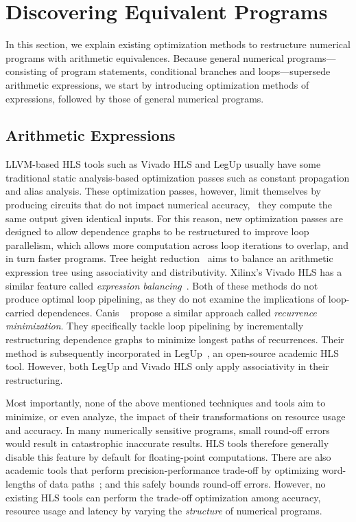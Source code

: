 \section{Discovering Equivalent Programs}
\label{bg:sec:discovering_equivalent_programs}

In this section, we explain existing optimization methods to restructure
numerical programs with arithmetic equivalences.  Because general numerical
programs---consisting of program statements, conditional branches and
loops---supersede arithmetic expressions, we start by introducing optimization
methods of expressions, followed by those of general numerical programs.


\subsection{Arithmetic Expressions}
\label{bg:sub:arithmetic_expressions}

LLVM-based HLS tools such as Vivado HLS and LegUp usually have some
traditional static analysis-based optimization passes such as constant
propagation and alias analysis.  These optimization passes, however, limit
themselves by producing circuits that do not impact numerical accuracy,
\ie~they compute the same output given identical inputs.  For this reason,
new optimization passes are designed to allow dependence graphs to be
restructured to improve loop parallelism, which allows more computation
across loop iterations to overlap, and in turn faster programs.  Tree height
reduction~\cite{nicolau91} aims to balance an arithmetic expression tree using
associativity and distributivity.  Xilinx's Vivado HLS has a similar feature
called \emph{expression balancing}~\cite{vivado_hls}.  Both of these methods do
not produce optimal loop pipelining, as they do not examine the implications
of loop-carried dependences.  Canis \etal~\cite{canis14} propose a similar
approach called \emph{recurrence minimization}. They specifically tackle
loop pipelining by incrementally restructuring dependence graphs to minimize
longest paths of recurrences.  Their method is subsequently incorporated in
LegUp~\cite{legup}, an open-source academic HLS tool.  However, both LegUp and
Vivado HLS only apply associativity in their restructuring.

Most importantly, none of the above mentioned techniques and tools aim to
minimize, or even analyze, the impact of their transformations on resource
usage and accuracy. In many numerically sensitive programs, small round-off
errors would result in catastrophic inaccurate results.  HLS tools therefore
generally disable this feature by default for floating-point computations.
There are also academic tools that perform precision-performance trade-off by
optimizing word-lengths of data paths~\cite{constantinides}; and this safely
bounds round-off errors.  However, no existing HLS tools can perform the
trade-off optimization among accuracy, resource usage and latency by varying
the \emph{structure} of numerical programs.

